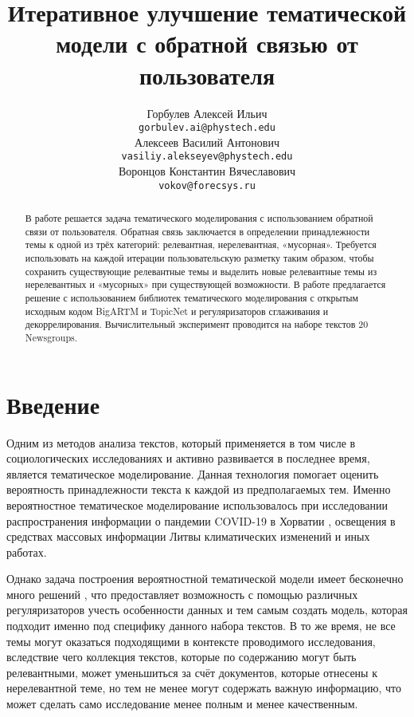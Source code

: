 \documentclass{article}
\title{Итеративное улучшение тематической модели с обратной связью от пользователя}
\author{ Горбулев Алексей Ильич \\
	\texttt{gorbulev.ai@phystech.edu} \\
	\And
	Алексеев Василий Антонович \\
	\texttt{vasiliy.alekseyev@phystech.edu} \\
	\And
    Воронцов Константин Вячеславович \\
    \texttt{vokov@forecsys.ru} \\
}
\date{}
\begin{document}
\maketitle

\begin{abstract}
	В работе решается задача тематического моделирования с использованием обратной связи от пользователя. Обратная связь заключается в определении принадлежности темы к одной из трёх категорий: релевантная, нерелевантная, «мусорная». Требуется использовать на каждой итерации пользовательскую разметку таким образом, чтобы сохранить существующие релевантные темы и выделить новые релевантные темы из нерелевантных и «мусорных» при существующей возможности. В работе предлагается решение с использованием библиотек тематического моделирования с открытым исходным кодом BigARTM и TopicNet и регуляризаторов сглаживания и декоррелирования. Вычислительный эксперимент проводится на наборе текстов 20 Newsgroups.
\end{abstract}



\section{Введение}
Одним из методов анализа текстов, который применяется в том числе в социологических исследованиях и активно развивается в последнее время, является тематическое моделирование. Данная технология помогает оценить вероятность принадлежности текста к каждой из предполагаемых тем. Именно вероятностное тематическое моделирование использовалось при исследовании распространения информации о пандемии COVID-19 в Хорватии \citep{pandemic2021}, освещения в средствах массовых информации Литвы климатических изменений \citep{climate2021} и иных работах.

Однако задача построения вероятностной тематической модели имеет бесконечно много решений \citep{bigartm}, что предоставляет возможность с помощью различных регуляризаторов учесть особенности данных и тем самым создать модель, которая подходит именно под специфику данного набора текстов. В то же время, не все темы могут оказаться подходящими в контексте проводимого исследования, вследствие чего коллекция текстов, которые по содержанию могут быть релевантными, может уменьшиться за счёт документов, которые отнесены к нерелевантной теме, но тем не менее могут содержать важную информацию, что может сделать само исследование менее полным и менее качественным.
\end{document}
